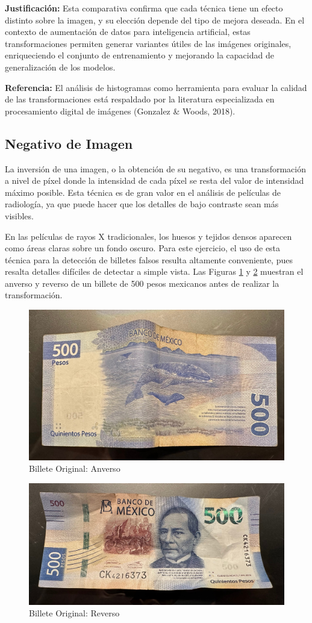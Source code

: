 \documentclass[12pt,letterpaper]{article}
\begin{document}
\textbf{Justificación:} Esta comparativa confirma que cada técnica tiene un efecto distinto sobre la imagen, y su elección depende del tipo de mejora deseada. En el contexto de aumentación de datos para inteligencia artificial, estas transformaciones permiten generar variantes útiles de las imágenes originales, enriqueciendo el conjunto de entrenamiento y mejorando la capacidad de generalización de los modelos.

\textbf{Referencia:} El análisis de histogramas como herramienta para evaluar la calidad de las transformaciones está respaldado por la literatura especializada en procesamiento digital de imágenes (Gonzalez & Woods, 2018).

\subsection{Negativo de Imagen}

La inversión de una imagen, o la obtención de su negativo, es una transformación a nivel de píxel donde la intensidad de cada píxel se resta del valor de intensidad máximo posible. Esta técnica es de gran valor en el análisis de películas de radiología, ya que puede hacer que los detalles de bajo contraste sean más visibles.

En las películas de rayos X tradicionales, los huesos y tejidos densos aparecen como áreas claras sobre un fondo oscuro. Para este ejercicio, el uso de esta técnica para la detección de billetes falsos resulta altamente conveniente, pues resalta detalles difíciles de detectar a simple vista. Las Figuras \ref{fig:billete_original_1} y \ref{fig:billete_original_2} muestran el anverso y reverso de un billete de 500 pesos mexicanos antes de realizar la transformación.

\begin{figure}[H]
  \centering
  \includegraphics[width=0.5\linewidth]{../data/billete-original/img1.jpg}
  \caption{Billete Original: Anverso}
  \label{fig:billete_original_1}
\end{figure}

\begin{figure}[H]
  \centering
  \includegraphics[width=0.5\linewidth]{../data/billete-original/img2.jpg}
  \caption{Billete Original: Reverso}
  \label{fig:billete_original_2}
\end{figure}
\end{document}
